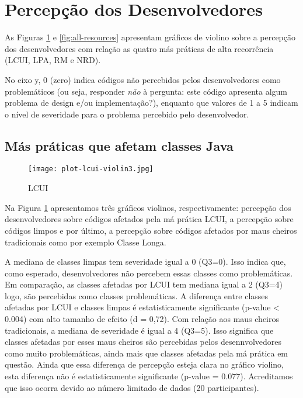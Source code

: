 \section{Percepção dos Desenvolvedores}
As Figuras \ref{fig:lcui} e \ref{fig:all-resources} apresentam gráficos de violino sobre a percepção dos desenvolvedores com relação as quatro más práticas de alta recorrência (LCUI, LPA, RM e NRD). 

No eixo y, 0 (zero) indica códigos não percebidos pelos desenvolvedores como problemáticos (ou seja, responder \emph{não} à pergunta: este código apresenta algum problema de design e/ou implementação?), enquanto que valores de 1 a 5 indicam o nível de severidade para o problema percebido pelo desenvolvedor.

\subsection{Más práticas que afetam classes Java}
\begin{figure}
	\centering
	\texttt{[image: plot-lcui-violin3.jpg]}
	\caption{LCUI}
	\label{fig:lcui}
\end{figure}

Na Figura \ref{fig:lcui} apresentamos três gráficos violinos, respectivamente: percepção dos desenvolvedores sobre códigos afetados pela má prática LCUI, a percepção sobre códigos limpos e por último, a percepção sobre códigos afetados por maus cheiros tradicionais como por exemplo Classe Longa. 

A mediana de classes limpas tem severidade igual a 0 (Q3=0). Isso indica que, como esperado, desenvolvedores não percebem essas classes como problemáticas. Em comparação, as classes afetadas por LCUI tem mediana igual a 2 (Q3=4) logo, são percebidas como classes problemáticas. A diferença entre classes afetadas por LCUI e classes limpas é estatisticamente significante (p-value < 0.004) com alto tamanho de efeito (d = 0,72). Com relação aos maus cheiros tradicionais, a mediana de severidade é igual a 4 (Q3=5). Isso significa que classes afetadas por esses maus cheiros são percebidas pelos desennvolvedores como muito problemáticas, ainda mais que classes afetadas pela má prática em questão. Ainda que essa diferença de percepção esteja clara no gráfico violino, esta diferença não é estatisticamente significante (p-value = 0.077). Acreditamos que isso ocorra devido ao número limitado de dados (20 participantes).

